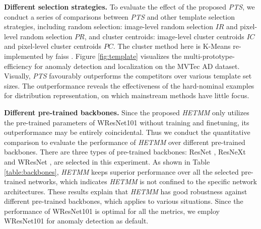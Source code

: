 \documentclass[default,iicol]{sn-jnl}\usepackage[algo2e,ruled,linesnumbered]{algorithm2e}
\theoremstyle{thmstyleone}\newtheorem{theorem}{Theorem}\newtheorem{proposition}[theorem]{Proposition}
\theoremstyle{thmstyletwo}\newtheorem{example}{Example}\newtheorem{remark}{Remark}
\theoremstyle{thmstylethree}\newtheorem{definition}{Definition}
\begin{document}
\noindent\textbf{Different selection strategies. }
To evaluate the effect of the proposed \textit{PTS}, we conduct a series of comparisons between \textit{PTS} and other template selection strategies, including random selection: image-level random selection $IR$ and pixel-level random selection $PR$, and cluster centroids: image-level cluster centroids $IC$ and pixel-level cluster centroids $PC$.
The cluster method here is K-Means \cite{kmeans} re-implemented by faiss \cite{faiss}.
Figure \ref{fig:template} visualizes the multi-prototype-efficiency for anomaly detection and localization on the MVTec AD dataset.
Visually, \textit{PTS} favourably outperforms the competitors over various template set sizes.
The outperformance reveals the effectiveness of the hard-nominal examples for distribution representation, on which mainstream methods have little focus.

\noindent\textbf{Different pre-trained backbones. }
Since the proposed \textit{HETMM} only utilizes the pre-trained parameters of WResNet101 \cite{wresnet} without training and finetuning, its outperformance may be entirely coincidental.
Thus we conduct the quantitative comparison to evaluate the performance of \textit{HETMM} over different pre-trained backbones.
There are three types of pre-trained backbones: ResNet \cite{resnet}, ResNeXt \cite{resnext} and WResNet \cite{wresnet}, are selected in this experiment.
As shown in Table \ref{table:backbones}, \textit{HETMM} keeps superior performance over all the selected pre-trained networks, which indicates \textit{HETMM} is not confined to the specific network architectures.
These results explain that \textit{HETMM} has good robustness against different pre-trained backbones, which applies to various situations.
Since the performance of WResNet101 is optimal for all the metrics, we employ WResNet101 for anomaly detection as default.
\end{document}
